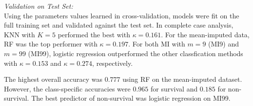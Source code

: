\documentclass[12pt,]{article}
\begin{document}
\emph{Validation on Test Set:}\\
Using the parameters values learned in cross-validation, models were fit
on the full training set and validated against the test set. In complete
case analysis, KNN with \(K=5\) performed the best with
\(\kappa=0.161\). For the mean-imputed data, RF was the top performer
with \(\kappa=0.197\). For both MI with \(m=9\) (MI9) and \(m=99\)
(MI99), logistic regression outperformed the other classfication methods
with \(\kappa=0.153\) and \(\kappa=0.274\), respectively.

The highest overall accuracy was \(0.777\) using RF on the mean-imputed
dataset. However, the class-specific accuracies were \(0.965\) for
survival and \(0.185\) for non-survival. The best predictor of
non-survival was logistic regression on MI99.
\end{document}
